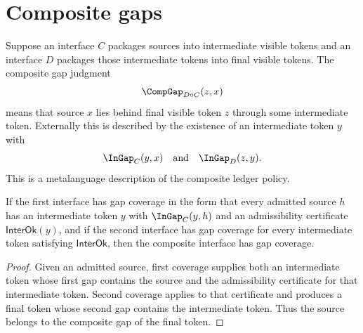 \section{Composite gaps}

\begin{definition}
\label{def:composite-gap-ledger}
Suppose an interface \(C\) packages sources into intermediate visible tokens and an interface \(D\) packages those intermediate tokens into final visible tokens. The composite gap judgment
$$
\CompGap_{D\circ C}(z,x)
$$
means that source \(x\) lies behind final visible token \(z\) through some intermediate token.
Externally this is described by the existence of an intermediate token \(y\) with
$$
\InGap_C(y,x)
\quad\text{and}\quad
\InGap_D(z,y).
$$
This is a metalanguage description of the composite ledger policy.
\end{definition}

\begin{theorem}
\label{thm:composite-coverage}
\label{thm:composite-gap-coverage-spine}
If the first interface has gap coverage in the form that every admitted source $h$ has an intermediate token $y$ with $\InGap_C(y,h)$ and an admissibility certificate $\mathsf{InterOk}(y)$, and if the second interface has gap coverage for every intermediate token satisfying $\mathsf{InterOk}$, then the composite interface has gap coverage.
\end{theorem}
\begin{proof}
Given an admitted source, first coverage supplies both an intermediate token whose first gap contains the source and the admissibility certificate for that intermediate token. Second coverage applies to that certificate and produces a final token whose second gap contains the intermediate token. Thus the source belongs to the composite gap of the final token.
\end{proof}

